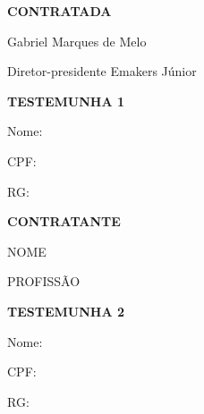 \documentclass[11pt,openright,twoside,a4paper,brazil, article]{abntex2}
\def\nome{NOME}
\def\profissao{PROFISSÃO}
\newcommand{\assigment}[2]{
    \begin{center}
        \underline{\hspace{7cm}}

        #1

        #2

    \end{center}
}
\begin{document}
    \begin{multicols}{2}
        \begin{center}
            \textbf{CONTRATADA}

            \bigskip
            
            \bigskip    

        \end{center}
        \assigment{Gabriel Marques de Melo}{Diretor-presidente Emakers Júnior}

        \bigskip

        \bigskip

        \bigskip

        \begin{center}
            \textbf{TESTEMUNHA 1}

            \bigskip            

        \end{center}

        Nome:

        \bigskip    

        CPF:

        \bigskip    

        RG:

        \bigskip    
        \assigment{}{}

        \begin{center}
            \textbf{CONTRATANTE}
            
            \bigskip
            
            \bigskip    

        \end{center}
        \assigment{\nome}{\profissao}

        \bigskip

        \bigskip

        \bigskip

        \begin{center}
            \textbf{TESTEMUNHA 2}
            
            \bigskip 

        \end{center}

        Nome:

        \bigskip    

        CPF:

        \bigskip    

        RG:

        \bigskip    

        \assigment{}{}

    \end{multicols}
\end{document}
